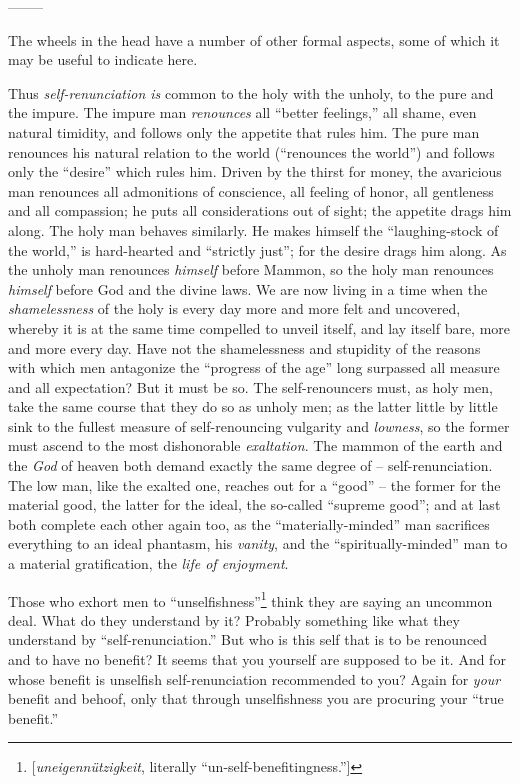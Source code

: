 \documentclass[12pt,a4paper]{book}
\begin{document}
\begin{center}
--------\end{center}


The wheels in the head have a number of other formal aspects, some of which it 
may be useful to indicate here.

Thus \textit{self-renunciation is} common to the holy with the unholy, to the 
pure and the impure. The impure man \textit{renounces} all ``better 
feelings,'' all shame, even natural timidity, and follows only the appetite 
that rules him. The pure man renounces his natural relation to the world 
(``renounces the world'') and follows only the ``desire'' which rules him. 
Driven by the thirst for money, the avaricious man renounces all admonitions 
of conscience, all feeling of honor, all gentleness and all compassion; he 
puts all considerations out of sight; the appetite drags him along. The holy 
man behaves similarly. He makes himself the ``laughing-stock of the world,'' 
is hard-hearted and ``strictly just''; for the desire drags him along. As 
the unholy man renounces \textit{himself} before Mammon, so the holy man 
renounces \textit{himself} before God and the divine laws. We are now living 
in a time when the \textit{shamelessness} of the holy is every day more and 
more felt and uncovered, whereby it is at the same time compelled to unveil 
itself, and lay itself bare, more and more every day. Have not the 
shamelessness and stupidity of the reasons with which men antagonize the 
``progress of the age'' long surpassed all measure and all expectation? But 
it must be so. The self-renouncers must, as holy men, take the same course 
that they do so as unholy men; as the latter little by little sink to the 
fullest measure of self-renouncing vulgarity and \textit{lowness}, so the 
former must ascend to the most dishonorable \textit{exaltation}. The mammon of 
the earth and the \textit{God} of heaven both demand exactly the same degree 
of -- self-renunciation. The low man, like the exalted one, reaches out for a 
``good'' -- the former for the material good, the latter for the ideal, the 
so-called ``supreme good''; and at last both complete each other again too, 
as the ``materially-minded'' man sacrifices everything to an ideal phantasm, 
his \textit{vanity}, and the ``spiritually-minded'' man to a material 
gratification, the \textit{life of enjoyment}.

Those who exhort men to 
``unselfishness''\footnote{[\textit{uneigenn\"utzigkeit}, literally 
``un-self-benefitingness.'']} think they are saying an uncommon deal. What 
do they understand by it? Probably something like what they understand by 
``self-renunciation.'' But who is this self that is to be renounced and to 
have no benefit? It seems that you yourself are supposed to be it. And for 
whose benefit is unselfish self-renunciation recommended to you? Again for 
\textit{your} benefit and behoof, only that through unselfishness you are 
procuring your ``true benefit.''
\end{document}
